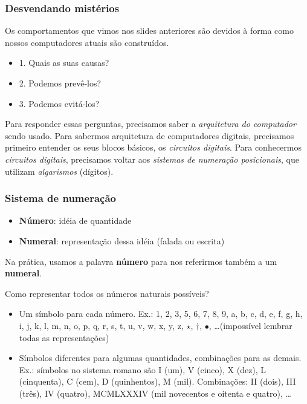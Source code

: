 \documentclass{beamer}
\begin{document}
\begin{frame}
\frametitle{Desvendando mistérios}

Os comportamentos que vimos nos slides anteriores são devidos à forma como nossos computadores atuais são construídos.

\pause

\vspace{12pt}

\begin{itemize}
\item 1. Quais as suas causas?
\item 2. Podemos prevê-los?
\item 3. Podemos evitá-los?
\end{itemize}

\vspace{12pt}

Para responder essas perguntas, precisamos saber a
\emph{arquitetura do computador} sendo usado. \pause
Para sabermos arquitetura de computadores digitais,
precisamos primeiro entender os seus blocos básicos,
os \emph{circuitos digitais}. \pause
Para conhecermos \emph{circuitos digitais}, precisamos
voltar aos \emph{sistemas de numeração posicionais},
que utilizam \emph{algarismos} (dígitos).
\end{frame}

\begin{frame}
\frametitle{Sistema de numeração}

\begin{itemize}
\item \textbf{Número}: idéia de quantidade
\item \textbf{Numeral}: representação dessa idéia (falada ou escrita)
\end{itemize}

Na prática, usamos a palavra \textbf{número} para nos referirmos também a um \textbf{numeral}.

\pause

\vspace{12pt}

Como representar todos os números naturais possíveis?

\pause

\begin{itemize}
\item Um símbolo para cada número. Ex.: 1, 2, 3, 5, 6, 7, 8, 9, a, b, c, d, e, f, g, h, i, j, k, l, m, n, o, p, q, r, s, t, u, v, w, x, y, z, $\star$, $\dagger$, $\bullet$, \ldots (impossível lembrar todas as representações)
\pause
\item Símbolos diferentes para algumas quantidades, combinações para as demais. Ex.: símbolos no sistema romano são I (um), V (cinco), X (dez), L (cinquenta), C (cem), D (quinhentos), M (mil). Combinações: II (dois), III (três), IV (quatro), MCMLXXXIV (mil novecentos e oitenta e quatro), \ldots
\end{itemize}
\end{frame}
\end{document}
